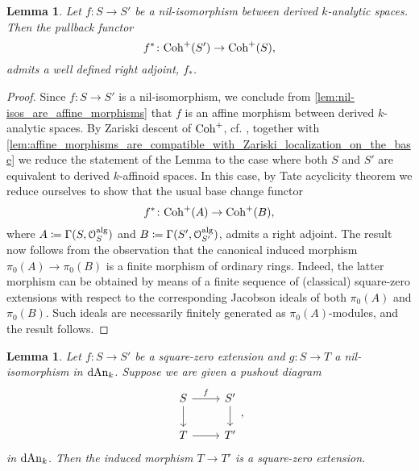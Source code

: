 \documentclass[10pt,a4paper,reqno]{amsart} %
\theoremstyle{plain}
\newtheorem{lem}[thm]{Lemma}
\theoremstyle{definition}
\theoremstyle{remark}
\numberwithin{equation}{section}
\begin{document}
\begin{lem} \label{lem:f^*_admits_a_right_adjoint_whenever_f_is_nil-iso}
    Let $f \colon S \to S'$ be a nil-isomorphism between derived $k$-analytic spaces. Then the pullback functor
        \[
            f^* \colon \mathrm{Coh}^+(S') \to \mathrm{Coh}^+(S),  
        \]
    admits a well defined right adjoint, $f_*$.
\end{lem}

\begin{proof}
    Since $f \colon S \to S'$ is a nil-isomorphism, we conclude from \cref{lem:nil-isos_are_affine_morphisms} that $f$ is an affine morphism
    between derived $k$-analytic spaces. By Zariski descent of $\mathrm{Coh}^+$, cf. \cite[Theorem 3.7]{Antonio_Porta_Nonarchimedean_Hilbert},
    together with \cref{lem:affine_morphisms_are_compatible_with_Zariski_localization_on_the_base} we reduce the statement of the Lemma to the case
    where both $S$ and $S'$ are equivalent to derived $k$-affinoid spaces. In this case, by Tate acyclicity theorem we reduce ourselves
    to show that the usual base change functor
        \[
           f^* \colon  \mathrm{Coh}^+(A) \to \mathrm{Coh}^+(B)  ,
        \]
    where $A \coloneqq \Gamma(S, \mathcal O_S ^\mathrm{alg})$ and $B \coloneqq \Gamma(S', \mathcal O_{S'} ^\mathrm{alg})$, admits a right adjoint. The result now follows from the observation
    that the canonical induced morphism $\pi_0(A) \to \pi_0(B)$ is a finite morphism of ordinary rings. Indeed, the latter morphism can be obtained
    by means of a finite sequence of (classical) square-zero extensions with respect to the corresponding Jacobson ideals of both $\pi_0(A)$ and $\pi_0(B)$.
    Such ideals are necessarily finitely generated as $\pi_0(A)$-modules, and the result follows.
\end{proof}

\begin{lem}
    Let $f \colon S \to S'$ be a square-zero extension and $g \colon S \to T$ a nil-isomorphism in $\mathrm{dAn}_k$. Suppose we are given a pushout diagram
        \[
        \begin{tikzcd}
            S \ar{r}{f} \ar{d} & S' \ar{d} \\
            T \ar{r} & T'  
        \end{tikzcd},
        \]
    in $\mathrm{dAn}_k$. Then the induced morphism $T \to T'$ is a square-zero extension.
\end{lem}
\end{document}
